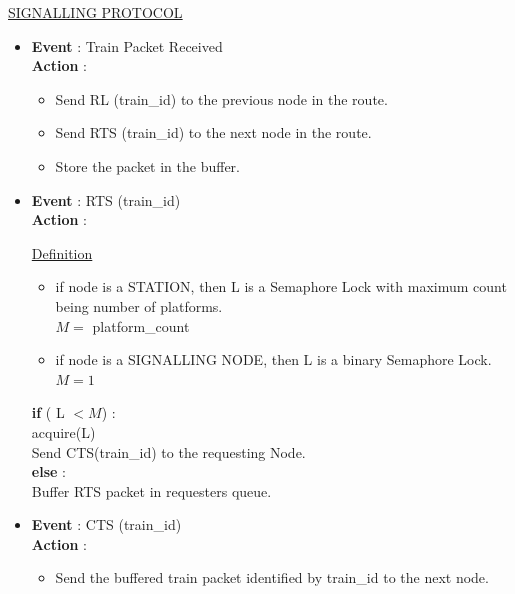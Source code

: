 \documentclass[twoside,11pt]{article}
\begin{document}
\newpage
\noindent \underline{ SIGNALLING PROTOCOL }
\begin{framed}
\begin{itemize}

	\item {\bf Event } : Train Packet Received \\
		  {\bf Action }: 
			\begin{itemize}
				\item Send RL (train\_id) to the previous node in the route.
				\item Send RTS (train\_id) to the next node in the route. 
				\item Store the packet in the buffer.
			\end{itemize}
			
	\item {\bf Event } : RTS (train\_id)  \\
		  {\bf Action }: \\
		  \begin{framed}
		  	\underline{Definition}
	\begin{itemize}
	\item if node is a STATION, then L is a Semaphore Lock with maximum count being number of platforms.\\ $ M = $ platform\_count
	
	\item if node is a SIGNALLING NODE, then L is a binary Semaphore Lock. \\ $ M = 1 $
\end{itemize}
	\end{framed}
    {\bf if} ( L $ < M $)  : \\
     \indent \hspace{0.1in}   acquire(L) \\
     \indent \hspace{0.1in}   Send CTS(train\_id) to the requesting Node. \\
    {\bf else} : \\
	\indent \hspace{0.1in}   Buffer RTS packet in requesters queue. 

	\item {\bf Event } : CTS (train\_id) \\
		  {\bf Action }:	 
	\begin{itemize}
		\item Send the buffered train packet identified by train\_id to the next node. 
	\end{itemize}


\end{itemize}
\end{framed}
\end{document}
